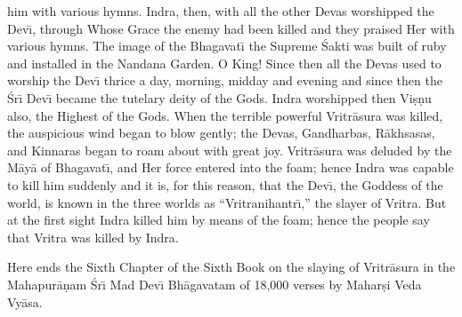 him with various hymns. Indra, then, with all the other Devas worshipped the Dev\={\i}, through Whose Grace the enemy had been killed and they praised Her with various hymns. The image of the Bhagavat\={\i} the Supreme \'Sakti was built of ruby and installed in the Nandana Garden. O King! Since then all the Devas used to worship the Dev\={\i} thrice a day, morning, midday and evening and since then the \'Sr\={\i} Dev\={\i} became the tutelary deity of the Gods. Indra worshipped then Vi\d{s}\d{n}u also, the Highest of the Gods. When the terrible powerful Vritr\=asura was killed, the auspicious wind began to blow gently; the Devas, Gandharbas, R\=akhsasas, and Kinnaras began to roam about with great joy. Vritr\=asura was deluded by the M\=ay\=a of Bhagavat\={\i}, and Her force entered into the foam; hence Indra was capable to kill him suddenly and it is, for this reason, that the Dev\={\i}, the Goddess of the world, is known in the three worlds as ``Vritranihantr\={\i},'' the slayer of Vritra. But at the first sight Indra killed him by means of the foam; hence the people say that Vritra was killed by Indra.

Here ends the Sixth Chapter of the Sixth Book on the slaying of Vritr\=asura in the Mahapur\=a\d{n}am \'Sr\={\i} Mad Dev\={\i} Bh\=agavatam of 18,000 verses by Mahar\d{s}i Veda Vy\=asa.



